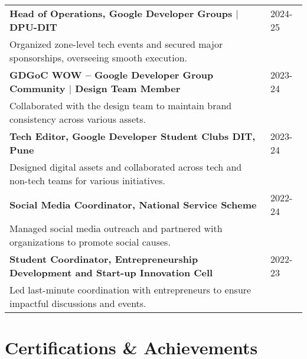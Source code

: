 \documentclass[a4paper,10pt]{article}
\begin{document}
\begin{tabularx}{\linewidth}{@{}l X@{}}	

\textbf{Head of Operations, Google Developer Groups $|$ DPU-DIT} & \hfill 
2024-25 \\ \vspace*{1mm}
Organized zone-level tech events and secured major sponsorships, overseeing smooth execution. \\

\textbf{GDGoC WOW – Google Developer Group Community $|$ Design Team Member} & \hfill 
2023-24 \\ \vspace*{1mm}
Collaborated with the design team to maintain brand consistency across various assets. \\

\textbf{Tech Editor, Google Developer Student Clubs DIT, Pune} & \hfill 
2023-24 \\ \vspace*{1mm}
Designed digital assets and collaborated across tech and non-tech teams for various initiatives. \\

\textbf{Social Media Coordinator, National Service Scheme} & \hfill 
2022-24 \\ \vspace*{1mm}
Managed social media outreach and partnered with organizations to promote social causes. \\ 

\textbf{Student Coordinator, Entrepreneurship Development and Start-up Innovation Cell} & \hfill 
2022-23 \\ \vspace*{1mm}
Led last-minute coordination with entrepreneurs to ensure impactful discussions and events. \\ 

\end{tabularx}

\section{Certifications \& Achievements}
\end{document}
